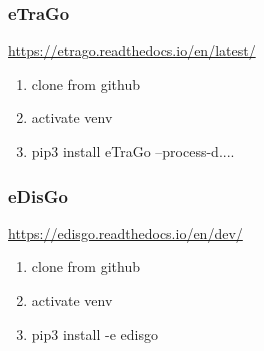 \documentclass[
a4paper,     %
12pt         %
]{scrartcl}  %
\begin{document}
\subsubsection{eTraGo}
\url{https://etrago.readthedocs.io/en/latest/}
\begin{enumerate}
	\item clone from github
	\item activate venv
	\item pip3 install eTraGo --process-d....
\end{enumerate}


\subsubsection{eDisGo}
\url{https://edisgo.readthedocs.io/en/dev/}
\begin{enumerate}
	\item clone from github
	\item activate venv
	\item pip3 install -e edisgo
\end{enumerate}


%
\end{document}
